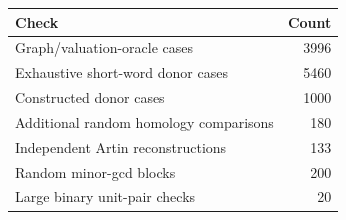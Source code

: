 \begin{tabular}{@{}lr@{}}
\toprule
Check & Count \\
\midrule
Graph/valuation-oracle cases & 3996 \\
Exhaustive short-word donor cases & 5460 \\
Constructed donor cases & 1000 \\
Additional random homology comparisons & 180 \\
Independent Artin reconstructions & 133 \\
Random minor-gcd blocks & 200 \\
Large binary unit-pair checks & 20 \\
\bottomrule
\end{tabular}
